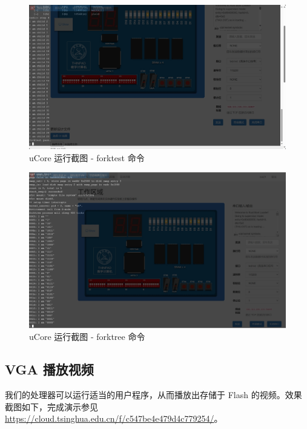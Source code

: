 \documentclass[12pt,a4paper,oneside]{ctexart}
\begin{document}
\begin{figure}[H]
    \centering
    \includegraphics[scale=0.15]{assets/ucore_forktest.png}
    \caption{uCore 运行截图 - forktest 命令}
    \label{fig:ucore_forktest}
\end{figure}

\begin{figure}[H]
    \centering
    \includegraphics[scale=0.18]{assets/ucore_forktree.png}
    \caption{uCore 运行截图 - forktree 命令}
    \label{fig:ucore_forktree}
\end{figure}

\subsection{VGA 播放视频}

我们的处理器可以运行适当的用户程序，从而播放出存储于 Flash 的视频。效果截图如下，完成演示参见 \href{https://cloud.tsinghua.edu.cn/f/c547be4e479d4c779254/}{https://cloud.tsinghua.edu.cn/f/c547be4e479d4c779254/}。
\end{document}
